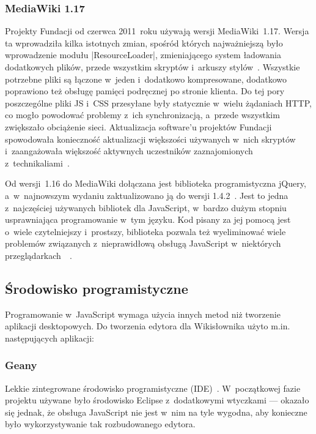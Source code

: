 \subsubsection{MediaWiki 1.17}
Projekty Fundacji od czerwca 2011~roku używają wersji MediaWiki~1.17. Wersja ta wprowadziła kilka istotnych zmian, spośród których najważniejszą było wprowadzenie modułu \kod|ResourceLoader|, zmieniającego system ładowania dodatkowych plików, przede wszystkim skryptów i~arkuszy stylów~\cite{mw:117}. Wszystkie potrzebne pliki są łączone w~jeden i~dodatkowo kompresowane, dodatkowo poprawiono też obsługę pamięci podręcznej po stronie klienta. Do tej pory poszczególne pliki JS i~CSS przesyłane były statycznie w~wielu żądaniach HTTP, co mogło powodować problemy z~ich synchronizacją, a~przede wszystkim zwiększało obciążenie sieci. Aktualizacja software'u projektów Fundacji spowodowała konieczność aktualizacji większości używanych w~nich skryptów i~zaangażowała większość aktywnych uczestników zaznajomionych z~technikaliami~\cite{mw:migration}.

Od wersji~1.16 do MediaWiki dołączana jest biblioteka programistyczna jQuery, a~w~najnowszym wydaniu zaktualizowano ją do wersji 1.4.2~\cite{mw:jquery}. Jest to jedna z~najczęściej używanych bibliotek dla JavaScript, w~bardzo dużym stopniu usprawniająca programowanie w~tym języku. Kod pisany za jej pomocą jest o~wiele czytelniejszy i~prostszy, biblioteka pozwala też wyeliminować wiele problemów związanych z~nieprawidłową obsługą JavaScript w~niektórych przeglądarkach~\cite{jquery:action}~\cite{jquery:doc}.

\subsection{Środowisko programistyczne}
Programowanie w~JavaScript wymaga użycia innych metod niż tworzenie aplikacji desktopowych. Do tworzenia edytora dla Wikisłownika użyto m.in. następujących aplikacji:

\subsubsection{Geany}
Lekkie zintegrowane środowisko programistyczne (IDE)~\cite{geany}. W~początkowej fazie projektu używane było środowisko Eclipse z~dodatkowymi wtyczkami --- okazało się jednak, że obsługa JavaScript nie jest w~nim na tyle wygodna, aby konieczne było wykorzystywanie tak rozbudowanego edytora.

